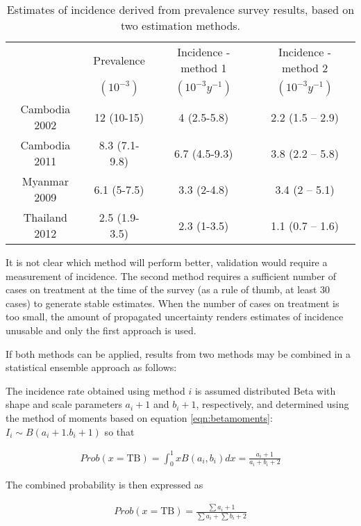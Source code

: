 \begin{table} 
\label{tab:2methods}
    \begin{tabular}{ c c c c }
    \hline
         & Prevalence & Incidence - method 1 & Incidence - method 2 \\ 
         & $(10^{-3})$  & $(10^{-3} y^{-1})$     & $(10^{-3} y^{-1})$ \\
    \hline
        Cambodia 2002 & 12 (10-15) & 4 (2.5-5.8) & 2.2 (1.5 – 2.9) \\ 
        Cambodia 2011 & 8.3 (7.1-9.8) & 6.7 (4.5-9.3) & 3.8 (2.2 – 5.8) \\ 
        Myanmar 2009 & 6.1 (5-7.5) & 3.3 (2-4.8) & 3.4 (2 – 5.1) \\ 
        Thailand 2012 & 2.5 (1.9-3.5) & 2.3 (1-3.5) & 1.1 (0.7 – 1.6) \\ 
    \hline
    \end{tabular} 
    \caption{Estimates of incidence derived from prevalence survey results, based on two estimation methods.} 
\end{table}

It is not clear which method will perform better, validation would require a measurement of incidence. The second method requires a sufficient number of cases on treatment at the time of the survey (as a rule of thumb, at least 30 cases) to generate stable estimates. When the number of cases on treatment is too small, the amount of propagated uncertainty renders estimates of incidence unusable and only the first approach is used. 

If both methods can be applied, results from two methods may be combined in a statistical ensemble approach as follows:

The incidence rate obtained using method $i$ is assumed distributed Beta with shape and scale parameters $a_i + 1$ and $b_i + 1$, respectively, and determined using the method of moments based on equation \ref{eqn:betamoments}: $I_i \sim B(a_i + 1. b_i + 1)$ so that 

\begin{align*}
Prob(x = \textrm{TB})= \int_{0}^{1} x B(a_i,b_i) dx = \frac{a_i+1}{a_i+b_i+2}
\end{align*}

The combined probability is then expressed as 

\begin{align*}
Prob(x = \textrm{TB}) = \frac{\sum{a_i}+1}{\sum{a_i}+\sum{b_i}+2} 
\end{align*}




